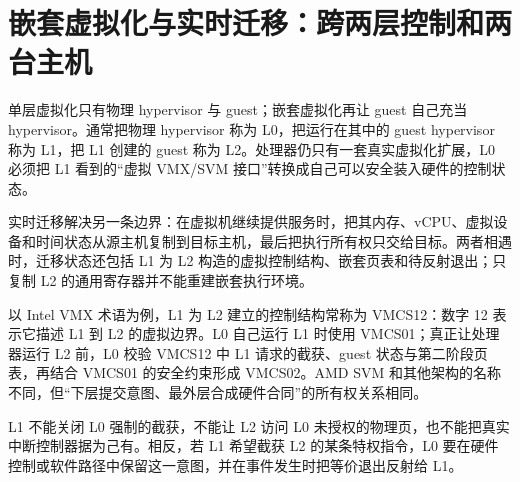 \section{嵌套虚拟化与实时迁移：跨两层控制和两台主机}

单层虚拟化只有物理 hypervisor 与 guest；嵌套虚拟化再让 guest 自己充当 hypervisor。通常把物理 hypervisor 称为 L0，把运行在其中的 guest hypervisor 称为 L1，把 L1 创建的 guest 称为 L2。处理器仍只有一套真实虚拟化扩展，L0 必须把 L1 看到的“虚拟 VMX/SVM 接口”转换成自己可以安全装入硬件的控制状态。\cite{linux-nested-vmx}

实时迁移解决另一条边界：在虚拟机继续提供服务时，把其内存、vCPU、虚拟设备和时间状态从源主机复制到目标主机，最后把执行所有权只交给目标。两者相遇时，迁移状态还包括 L1 为 L2 构造的虚拟控制结构、嵌套页表和待反射退出；只复制 L2 的通用寄存器并不能重建嵌套执行环境。


以 Intel VMX 术语为例，L1 为 L2 建立的控制结构常称为 VMCS12：数字 12 表示它描述 L1 到 L2 的虚拟边界。L0 自己运行 L1 时使用 VMCS01；真正让处理器运行 L2 前，L0 校验 VMCS12 中 L1 请求的截获、guest 状态与第二阶段页表，再结合 VMCS01 的安全约束形成 VMCS02。AMD SVM 和其他架构的名称不同，但“下层提交意图、最外层合成硬件合同”的所有权关系相同。

L1 不能关闭 L0 强制的截获，不能让 L2 访问 L0 未授权的物理页，也不能把真实中断控制器据为己有。相反，若 L1 希望截获 L2 的某条特权指令，L0 要在硬件控制或软件路径中保留这一意图，并在事件发生时把等价退出反射给 L1。

